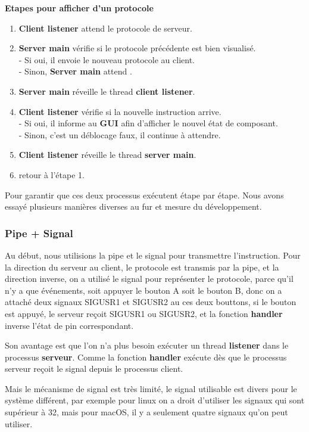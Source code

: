 \documentclass[14px]{article}
\begin{document}
	\textbf{Etapes pour afficher d'un protocole}
	\begin{enumerate}
		\item \textbf{Client listener} attend le protocole de serveur.
		\item \textbf{Server main} vérifie si le protocole précédente est bien visualisé.\\
		- Si oui, il envoie le nouveau protocole au client.\\
		- Sinon, \textbf{Server main} attend .
		\item \textbf{Server main} réveille le thread \textbf{client listener}.
		\item \textbf{Client listener} vérifie si la nouvelle instruction arrive.\\
		- Si oui, il informe au \textbf{GUI} afin d'afficher le nouvel état de composant.\\
		- Sinon, c'est un déblocage faux, il continue à attendre.
		\item \textbf{Client listener} réveille le thread \textbf{server main}.
		\item retour à l'étape 1.
	\end{enumerate}
	
	Pour garantir que ces deux processus exécutent étape par étape. Nous avons essayé plusieurs manières diverses au fur et mesure du développement.
	
	\subsubsection{Pipe + Signal}
	Au début, nous utilisions la pipe et le signal pour transmettre l'instruction. Pour la direction du serveur au client, le protocole est transmis par la pipe, et la direction inverse, on a utilisé le signal pour représenter le protocole, parce qu'il n'y a que événements, soit appuyer le bouton A soit le bouton B, donc on a attaché deux signaux SIGUSR1 et SIGUSR2 au ces deux bouttons, si le bouton est appuyé, le serveur reçoit SIGUSR1 ou SIGUSR2, et la fonction \textbf{handler} inverse l'état de pin correspondant.
	
	Son avantage est que l'on n'a plus besoin exécuter un thread \textbf{listener} dans le processus \textbf{serveur}. Comme la fonction \textbf{handler} exécute dès que le processus serveur reçoit le signal depuis le processus client.
	
	Mais le mécanisme de signal est très limité, le signal utilisable est divers pour le système différent, par exemple pour linux on a droit d'utiliser les signaux qui sont supérieur à 32, mais pour macOS, il y a seulement quatre signaux qu'on peut utiliser.
	
\end{document}
